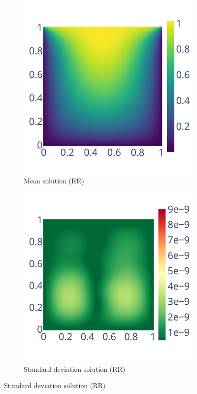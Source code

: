 \begin{figure}
    \centering
    \begin{subfigure}{0.45\linewidth}
        \includegraphics[width=\linewidth]{figure/root_finding/solution_mean_RR.pdf}
        \caption{Mean solution (RR)}
        \label{fig:mean_solution_rr}
    \end{subfigure}
    \begin{subfigure}{0.45\linewidth}
        \includegraphics[width=\linewidth]{figure/root_finding/solution_std_RR.pdf}
        \caption{Standard deviation solution (RR)}
        \label{fig:stdev_rr}
    \end{subfigure}


\end{figure}
